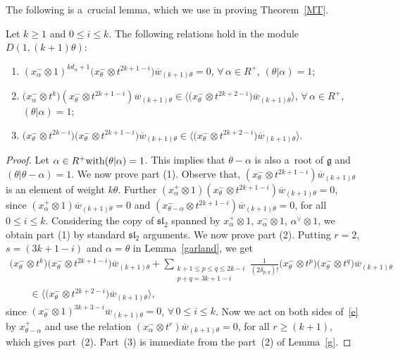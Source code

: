 The following is a~crucial lemma, which we use in proving Theorem~\ref{MT}.
\begin{lemma}
\label{crucial}
Let $k\geq 1$ and $0\leq i \leq k$. The following relations hold in the module $D(1,(k+1)\theta)$:
\begin{enumerate}\itemsep=0pt
\item[$1)$] $(x^{-}_{\alpha} \otimes 1)^{kd_{\alpha}+1}\big(x^{-}_{\theta} \otimes t^{2k+1-i}\big) \overline{w}_{(k+1)\theta}=0$,
$\forall\, \alpha \in R^{+}$, $(\theta|\alpha)=1$;
\item[$2)$] $\big(x^{-}_{\alpha} \otimes t^{k}\big) (x^{-}_{\theta} \otimes t^{2k+1-i}) \overline{w}_{(k+1)\theta} \in
\big\langle \big(x^{-}_{\theta} \otimes t^{2k+2-i}\big) \overline{w}_{(k+1)\theta} \big\rangle$,
$\forall\, \alpha \in R^{+}$, $(\theta|\alpha)=1$;
\item[$3)$] $\big(x^{-}_{\theta} \otimes t^{2k-i}\big) \big(x^{-}_{\theta} \otimes t^{2k+1-i}\big) \overline{w}_{(k+1)\theta}
\in
\big\langle \big(x^{-}_{\theta} \otimes t^{2k+2-i}\big) \overline{w}_{(k+1)\theta} \big\rangle$.
\end{enumerate}
\end{lemma}
\begin{proof}
Let $ \alpha \in R^{+} \textup{with} (\theta|\alpha)=1$. This implies that $\theta-\alpha$ is also a~root of
$\mathfrak{g}$ and $(\theta|\theta-\alpha)=1$. We now prove part (1).
Observe that, $(x^{-}_{\theta} \otimes t^{2k+1-i}) \overline{w}_{(k+1)\theta}$ is an element of weight $k\theta$.
Further $(x^{+}_{\alpha} \otimes 1) (x^{-}_{\theta} \otimes t^{2k+1-i}) \overline{w}_{(k+1)\theta}=0$, since
$(x^{+}_{\alpha} \otimes 1)\overline{w}_{(k+1)\theta}=0$ and $(x^{-}_{\theta-\alpha} \otimes t^{2k+1-i}) \overline{w}_{(k+1)\theta}=0$,
for all $0\leq i \leq k$.
Considering the copy of $\mathfrak{sl}_2$ spanned by $x^{+}_{\alpha} \otimes 1$, $x^{-}_{\alpha} \otimes 1$,
$\alpha^{\vee}\otimes 1$, we obtain part (1) by standard $\mathfrak{sl}_2$ arguments.
We now prove part (2).
Putting $r=2$, $s=(3k+1-i)$ and $\alpha=\theta$ in Lemma~\ref{garland}, we get
\begin{gather}
\big(x^{-}_{\theta} \otimes t^{k}\big) \big(x^{-}_{\theta} \otimes t^{2k+1-i}\big) \overline{w}_{(k+1)\theta} +
\sum\limits_{\substack{k+1\leq p\leq q \leq 2k-i\\p+q= 3k+1-i}}
\frac{1}{(2\delta_{p, q})!} \big(x^{-}_{\theta} \otimes t^{p}\big) \big(x^{-}_{\theta} \otimes t^{q}\big)
\overline{w}_{(k+1)\theta}
\nonumber\\
\qquad{}
\in
\big\langle\big(x^{-}_{\theta}\otimes t^{2k+2-i}\big) \overline{w}_{(k+1)\theta} \big\rangle, \label{e}
\end{gather}
since $(x^{-}_{\theta}\otimes 1)^{3k+3-i}\overline{w}_{(k+1)\theta}=0$, $\forall\, 0\leq i \leq k$.
Now we act on both sides of~\eqref{e} by $x^{+}_{\theta-\alpha}$ and use the relation $(x^{-}_{\alpha} \otimes t^r) \overline{w}_{(k+1)\theta}=0$,
for all $r\geq(k+1)$, which gives part~(2).
Part~(3) is immediate from the part~(2) of Lemma~\ref{g}.
\end{proof}

